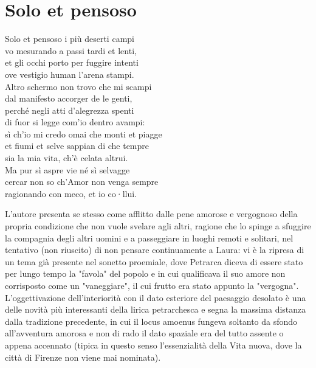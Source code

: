 \documentclass[10pt,a4paper]{article}
\begin{document}
\section{Solo et pensoso}
\label{sec:Solo et pensoso}

\begin{estratto}
	Solo et pensoso i più deserti campi\\
	vo mesurando a passi tardi et lenti,\\
	et gli occhi porto per fuggire intenti\\
	ove vestigio human l’arena stampi.\\
	
	Altro schermo non trovo che mi scampi\\
	dal manifesto accorger de le genti,\\
	perché negli atti d’alegrezza spenti\\
	di fuor si legge com’io dentro avampi:\\
	
	sì ch’io mi credo omai che monti et piagge\\
	et fiumi et selve sappian di che tempre\\
	sia la mia vita, ch’è celata altrui.\\
	
	Ma pur sì aspre vie né sì selvagge\\
	cercar non so ch’Amor non venga sempre\\
	ragionando con meco, et io co·llui.\\
\end{estratto}

L'autore presenta se stesso come afflitto dalle pene amorose e vergognoso della propria condizione che non vuole svelare agli altri, ragione che lo spinge a sfuggire la compagnia degli altri uomini e a passeggiare in luoghi remoti e solitari, nel tentativo (non riuscito) di non pensare continuamente a Laura: vi è la ripresa di un tema già presente nel sonetto proemiale, dove Petrarca diceva di essere stato per lungo tempo la "favola" del popolo e in cui qualificava il suo amore non corrisposto come un "vaneggiare", il cui frutto era stato appunto la "vergogna". L'oggettivazione dell'interiorità con il dato esteriore del paesaggio desolato è una delle novità più interessanti della lirica petrarchesca e segna la massima distanza dalla tradizione precedente, in cui il locus amoenus fungeva soltanto da sfondo all'avventura amorosa e non di rado il dato spaziale era del tutto assente o appena accennato (tipica in questo senso l'essenzialità della Vita nuova, dove la città di Firenze non viene mai nominata).
\end{document}

